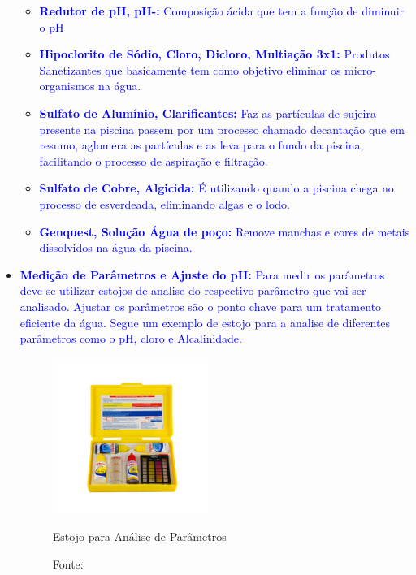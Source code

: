 \begin{itemize}
\begin{itemize}
                    \item \textbf{\textcolor{blue}{Redutor de pH, pH-:}} \textcolor{blue}{Composição ácida que tem a função de diminuir o pH}
    
                    \item \textbf{\textcolor{blue}{Hipoclorito de Sódio, Cloro, Dicloro, Multiação 3x1:}} \textcolor{blue}{Produtos Sanetizantes que basicamente tem como objetivo eliminar os micro-organismos na água.}
    
                    \item \textbf{\textcolor{blue}{Sulfato de Alumínio, Clarificantes:}} \textcolor{blue}{Faz as partículas de sujeira presente na piscina passem por um processo chamado decantação que em resumo, aglomera as partículas e as leva para o fundo da piscina, facilitando o processo de aspiração e filtração.}
    
                    \item \textbf{\textcolor{blue}{Sulfato de Cobre, Algicida:}} \textcolor{blue}{É utilizando quando a piscina chega no processo de esverdeada, eliminando algas e o lodo.}
    
                    \item \textbf{\textcolor{blue}{Genquest, Solução Água de poço:}} \textcolor{blue}{Remove manchas e cores de metais dissolvidos na água da piscina.}
    
                \end{itemize}
                
            \item \textbf{\textcolor{blue}{Medição de Parâmetros e Ajuste do pH:}} \textcolor{blue}{Para medir os parâmetros deve-se utilizar estojos de analise do respectivo parâmetro que vai ser analisado. Ajustar os parâmetros são o ponto chave para um tratamento eficiente da água. Segue um exemplo de estojo para a analise de diferentes parâmetros como o pH, cloro e Alcalinidade.}

            \begin{figure}[H]
                    \centering
                    \caption{ }  
                	\centering
                    \label{fig:cont}
                	\includegraphics[width=0.48\textwidth]{imagens/estojoMedidor.png}
                    \caption*{Estojo para Análise de Parâmetros}
                	\caption*{Fonte: \cite{gencoEmpresa}}
            \end{figure}


\end{itemize}
